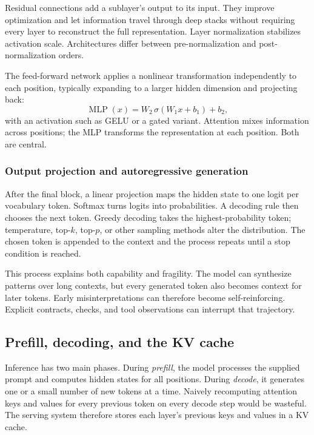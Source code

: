 \documentclass[11pt,a4paper]{article}
\begin{document}
Residual connections add a sublayer's output to its input. They improve optimization and let information travel through deep stacks without requiring every layer to reconstruct the full representation. Layer normalization stabilizes activation scale. Architectures differ between pre-normalization and post-normalization orders.

The feed-forward network applies a nonlinear transformation independently to each position, typically expanding to a larger hidden dimension and projecting back:
\begin{equation}
\operatorname{MLP}(x)=W_2\,\sigma(W_1x+b_1)+b_2,
\end{equation}
with an activation such as GELU or a gated variant. Attention mixes information across positions; the MLP transforms the representation at each position. Both are central.

\subsubsection{Output projection and autoregressive generation}

After the final block, a linear projection maps the hidden state to one logit per vocabulary token. Softmax turns logits into probabilities. A decoding rule then chooses the next token. Greedy decoding takes the highest-probability token; temperature, top-$k$, top-$p$, or other sampling methods alter the distribution. The chosen token is appended to the context and the process repeats until a stop condition is reached.

This process explains both capability and fragility. The model can synthesize patterns over long contexts, but every generated token also becomes context for later tokens. Early misinterpretations can therefore become self-reinforcing. Explicit contracts, checks, and tool observations can interrupt that trajectory.

\subsection{Prefill, decoding, and the KV cache}\label{sec:kv-cache}

Inference has two main phases. During \emph{prefill}, the model processes the supplied prompt and computes hidden states for all positions. During \emph{decode}, it generates one or a small number of new tokens at a time. Naively recomputing attention keys and values for every previous token on every decode step would be wasteful. The serving system therefore stores each layer's previous keys and values in a KV cache.
\end{document}
